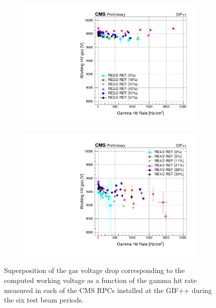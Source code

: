 \begin{figure}[H]
\begin{subfigure}{0.5\linewidth}
        	\caption{\label{fig:GIFpp_hvgas_vs_rate:B}}
    	\end{subfigure}
    	\begin{subfigure}{0.5\linewidth}
			\centering
    		\includegraphics[width = \linewidth]{fig/chapt5/RE2-2_REF_HVgas_vs_Rate.pdf}
        	\caption{\label{fig:GIFpp_hvgas_vs_rate:C}}
    	\end{subfigure}
    	\begin{subfigure}{0.5\linewidth}
			\centering
    		\includegraphics[width = \linewidth]{fig/chapt5/RE4-2_REF_HVgas_vs_Rate.pdf}
        	\caption{\label{fig:GIFpp_hvgas_vs_rate:D}}
    	\end{subfigure}
		\caption{\label{fig:GIFpp_hvgas_vs_rate} Superposition of the gas voltage drop corresponding to the computed working voltage as a function of the gamma hit rate measured in each of the CMS RPCs installed at the GIF++ during the six test beam periods.}
	\end{figure}
	
